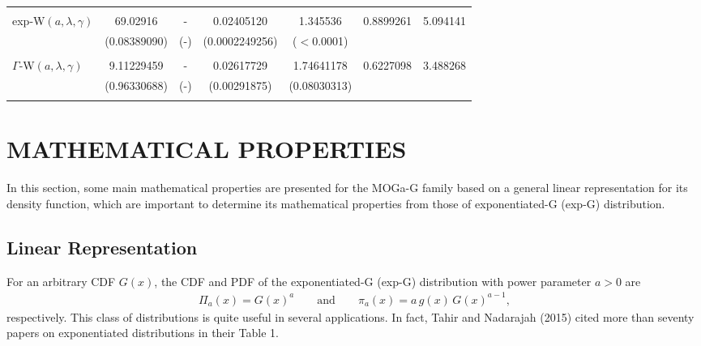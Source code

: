 \documentclass[twoside,leqno,11pt]{article}
\begin{document}
\begin{table}[htb!]
\begin{tabular}{lcccccc}
 & & & & &  \\
 exp-W$(a,\lambda,\gamma)$   &    69.02916  & - &   0.02405120 & 1.345536 &   0.8899261   & 5.094141 \\
                          &   (0.08389090) & (-) & (0.0002249256) & ($<$0.0001)   &  & \\

 & & & & &  \\
 $\Gamma$-W$(a,\lambda,\gamma)$    & 9.11229459   & - &  0.02617729 & 1.74641178 &    0.6227098 & 3.488268  \\
                             &  (0.96330688)&  (-)&  (0.00291875) & (0.08030313)     &  & \\

 & & & & &  \\




                                                    \hline
\end{tabular}
\end{table}



\section{MATHEMATICAL PROPERTIES}\label{properties}


In this section, some main mathematical properties are presented for the MOGa-G family
based on a general linear representation for its density function, which are important
to determine its mathematical properties from those of exponentiated-G (exp-G) distribution.

\subsection{Linear Representation}


For an arbitrary CDF $G(x)$, the CDF and PDF of the exponentiated-G (exp-G) distribution with power parameter $a>0$ are
\begin{eqnarray*}
\Pi_a(x)=G(x)^a\qquad\text{and}\qquad\pi_a(x)=a\,g(x)\,G(x)^{a-1},
\end{eqnarray*}
respectively. This class of distributions is quite useful in several applications. In fact, Tahir and Nadarajah (2015)
cited more than seventy papers on exponentiated distributions in their Table 1.
\end{document}
